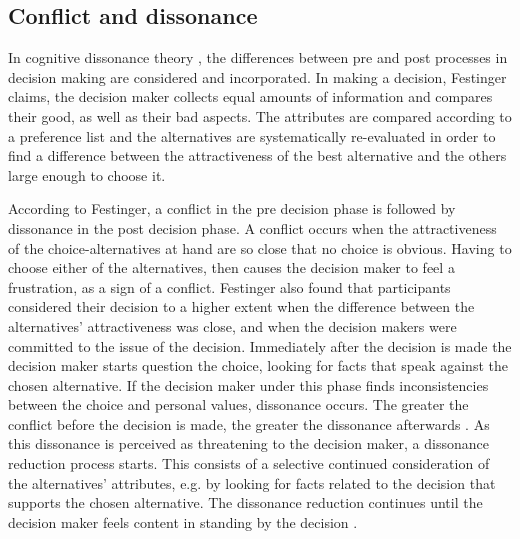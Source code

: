\documentclass[jou,11pt]{apa6}
\begin{document}
\subsection{Conflict and dissonance}

In cognitive dissonance theory \parencite{festinger64}, the differences
between pre and post processes in decision making are considered and
incorporated.  In making a decision, Festinger claims, the decision
maker collects equal amounts of information and compares their good,
as well as their bad aspects.  The attributes are compared according
to a preference list and the alternatives are systematically
re-evaluated in order to find a difference between the attractiveness
of the best alternative and the others large enough to choose it.

According to Festinger, a conflict in the pre decision phase is
followed by dissonance in the post decision phase.  A conflict occurs
when the attractiveness of the choice-alternatives at hand are so
close that no choice is obvious.  Having to choose either of the
alternatives, then causes the decision maker to feel a frustration, as
a sign of a conflict.  Festinger also found that participants
considered their decision to a higher extent when the difference
between the alternatives' attractiveness was close, and when the
decision makers were committed to the issue of the decision.
Immediately after the decision is made the decision maker starts
question the choice, looking for facts that speak against the chosen
alternative.  If the decision maker under this phase finds
inconsistencies between the choice and personal values, dissonance
occurs.  The greater the conflict before the decision is made, the
greater the dissonance afterwards \parencite{festinger64}.  As this
dissonance is perceived as threatening to the decision maker, a
dissonance reduction process starts.  This consists of a selective
continued consideration of the alternatives' attributes, e.g. by
looking for facts related to the decision that supports the chosen
alternative.  The dissonance reduction continues until the decision
maker feels content in standing by the decision
\parencite{festinger64}.
\end{document}
